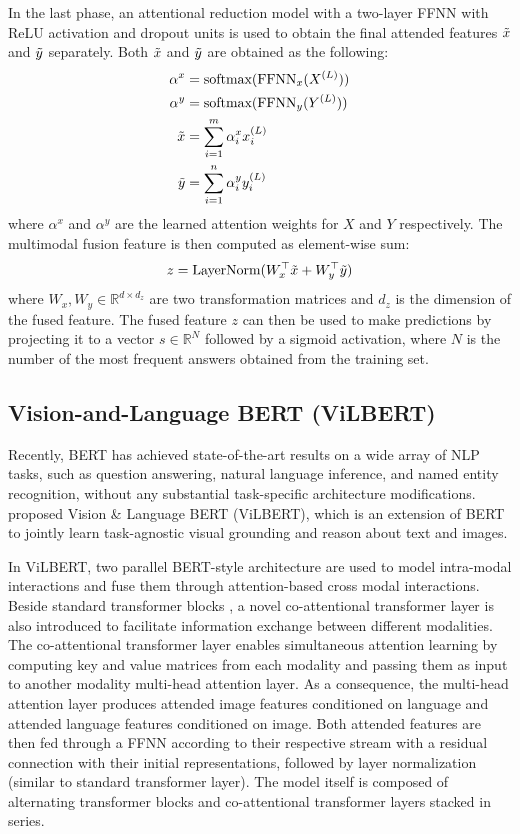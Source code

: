\documentclass{article}
\begin{document}
In the last phase, an attentional reduction model with a two-layer FFNN with ReLU activation and dropout units is used to obtain the final attended features $\Tilde{x}$ and $\Tilde{y}$ separately. Both $\Tilde{x}$ and $\Tilde{y}$ are obtained as the following:
\begin{align}
    \alpha^{x} &= \text{softmax}(\text{FFNN}_{x}(X^{(L)})) \\
    \alpha^{y} &= \text{softmax}(\text{FFNN}_{y}(Y^{(L)})) \\
    \Tilde{x} &= \sum_{i=1}^{m}\alpha^{x}_{i}x^{(L)}_{i}  \label{eq_mcan_att} \\ 
     \Tilde{y} &= \sum_{i=1}^{n}\alpha^{y}_{i}y^{(L)}_{i}
\end{align}
where $\alpha^{x}$ and $\alpha^{y}$ are the learned attention weights for $X$ and $Y$ respectively. The multimodal fusion feature is then computed as element-wise sum:
\begin{align}
    z = \text{LayerNorm}(W^{\top}_{x}\Tilde{x} + W^{\top}_{y}\Tilde{y})
\end{align}
where $W_{x}, W_{y} \in \mathbb{R}^{d \times d_{z}}$ are two transformation matrices and $d_{z}$ is the dimension of the fused feature. The fused feature $z$ can then be used to make predictions by projecting it to a vector $s \in \mathbb{R}^{N}$ followed by a sigmoid activation, where $N$ is the number of the most frequent answers obtained from the training set.

\subsection{Vision-and-Language BERT (ViLBERT)} \label{vilbert}
Recently, BERT \citep{devlin-etal-2019-bert} has achieved state-of-the-art results on a wide array of NLP tasks, such as question answering, natural language inference, and named entity recognition, without any substantial task-specific architecture modifications. \citet{lu2019vilbert} proposed Vision \& Language BERT (ViLBERT), which is an extension of BERT to jointly learn task-agnostic visual grounding and reason about text and images. 

In ViLBERT, two parallel BERT-style architecture are used to model intra-modal interactions and fuse them through attention-based cross modal interactions. Beside standard transformer blocks \citep{transformers}, a novel co-attentional transformer layer is also introduced to facilitate information exchange between different modalities. The co-attentional transformer layer enables simultaneous attention learning by computing key and value matrices from each modality and passing them as input to another modality multi-head attention layer. As a consequence, the multi-head attention layer produces attended image features conditioned on language and attended language features conditioned on image. Both attended features are then fed through a FFNN according to their respective stream with a residual connection with their initial representations, followed by layer normalization (similar to standard transformer layer). The model itself is composed of alternating transformer blocks and co-attentional transformer layers stacked in series. 
\end{document}
